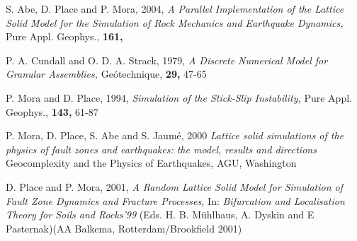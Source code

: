 \documentclass{manual}
\begin{document}
\begin{thebibliography}{1}

        {\normalsize \textrm{S. Abe, D. Place and P. Mora, 2004, } \textit{A Parallel Implementation of the Lattice Solid Model for the Simulation of Rock Mechanics and Earthquake Dynamics, } \textrm{Pure Appl. Geophys., {\bf 161,}}}

  {\normalsize \textrm{P. A. Cundall and O. D. A. Strack, 1979, } \textit{A Discrete Numerical Model for Granular Assemblies, }\textrm{Ge\'otechnique, {\bf 29,} 47-65}}

  {\textrm {P. Mora and D. Place, 1994, }\textit{Simulation of the Stick-Slip Instability, }\textrm{Pure Appl. Geophys., {\bf 143,} 61-87}}

  {\normalsize \textrm{P. Mora, D. Place, S. Abe and S. Jaum\'e, 2000 } \textit{Lattice solid simulations of the physics of fault zones and earthquakes: the model, results and directions }\textrm{ Geocomplexity and the Physics of Earthquakes, AGU, Washington}}

        {\normalsize \textrm {D. Place and P. Mora, 2001, } \textit{A Random Lattice Solid Model for Simulation of Fault Zone Dynamics and Fracture Processes, } \textrm{In:} \textit{Bifurcation and Localisation Theory for Soils and Rocks'99 }\textrm{(Eds. H. B. M\"uhlhaus, A. Dyskin and E Pasternak)(AA Balkema, Rotterdam/Brookfield 2001)}}    

\end{thebibliography}
\end{document}
